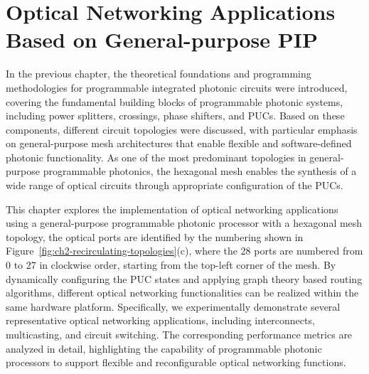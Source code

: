 \chapter[Optical Networking Applications Based on General-purpose PIP]{
  Optical Networking Applications Based on General-purpose PIP
 }\label{chap:applications_on_pip} %
In the previous chapter, the theoretical foundations and programming methodologies for programmable integrated photonic circuits were introduced, covering the fundamental building blocks of programmable photonic systems, including power splitters, crossings, phase shifters, and PUCs.
Based on these components, different circuit topologies were discussed, with particular emphasis on general-purpose mesh architectures that enable flexible and software-defined photonic functionality.
As one of the most predominant topologies in general-purpose programmable photonics, the hexagonal mesh enables the synthesis of a wide range of optical circuits through appropriate configuration of the PUCs.

This chapter explores the implementation of optical networking applications using a general-purpose programmable photonic processor with a hexagonal mesh topology,
the optical ports are identified by the numbering shown in Figure~\ref{fig:ch2-recirculating-topologies}(c), where the 28 ports are numbered from 0 to 27 in clockwise order, starting from the top-left corner of the mesh.
By dynamically configuring the PUC states and applying graph theory based routing algorithms, different optical networking functionalities can be realized within the same hardware platform.
Specifically, we experimentally demonstrate several representative optical networking applications, including interconnects, multicasting, and circuit switching.
The corresponding performance metrics are analyzed in detail, highlighting the capability of programmable photonic processors to support flexible and reconfigurable optical networking functions.

